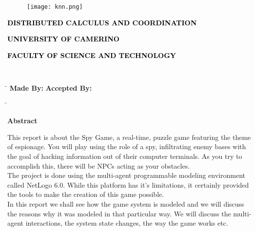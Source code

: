 \documentclass[12pt]{article}
\begin{document}
\pagestyle{empty}
\pagecolor{camerinoRed}
\begin{large}
\begin{center}
\begin{figure}
\centering
\texttt{[image: knn.png]}
\end{figure}
\textbf{\textcolor{black}{\uppercase{Distributed Calculus and Coordination}}}
\end{center}
\end{large}
\begin{normalsize}
\begin{center}
\textbf{\textcolor{black}{\uppercase{University of Camerino}}}

\textbf{\textcolor{black}{\uppercase{Faculty of Science and Technology}}}
\end{center}
\end{normalsize}

\vspace{3cm}


\begin{Huge}
\begin{center}
\textbf{\textit{\textcolor{white}{The Spy Game}}}
\end{center}
\end{Huge}


\vfill
\begin{tabbing}
 \hspace{11cm}\=\kill
  \textcolor{camerinoBlue}{\textbf{Made By:}} \> \textcolor{camerinoBlue}{\textbf{Accepted By:}}
 \end{tabbing}  
 \begin{tabbing}
 \hspace{11cm}\=\kill
  \textcolor{white}{Joni Seraj} \> \textcolor{white}{Emanuela Merelli}
 \end{tabbing}
 \newpage 
 \pagecolor{white}
 \begin{Huge}
 \textbf{Abstract}
 \end{Huge}
 \vspace{1cm}
 
 \begin{normalsize}
This report is about the Spy Game, a real-time, puzzle game featuring the theme of espionage. You will play using the role of a spy, infiltrating enemy bases with the goal of hacking information out of their computer terminals. As you try to accomplish this, there will be NPCs acting as your obstacles.
\\
The project is done using the multi-agent programmable modeling environment called NetLogo 6.0. While this platform has it's limitations, it certainly provided the tools to make the creation of this game possible.
\\
In this report we shall see how the game system is modeled and we will discuss the reasons why it was modeled in that particular way. We will discuss the multi-agent interactions, the system state changes, the way the game works etc.
 \end{normalsize}
\end{document}
